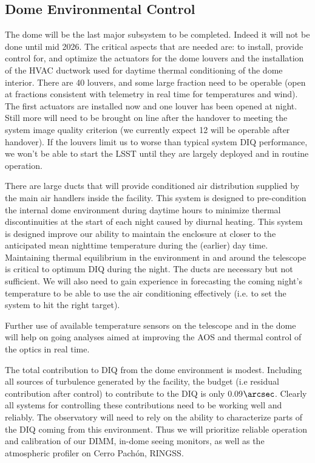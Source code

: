 \subsection{Dome Environmental Control}
The dome will be the last major subsystem to be completed. Indeed it will not be done until mid 2026. The critical aspects that are needed are: to install, provide control for, and optimize the actuators for the dome louvers and the installation of the HVAC ductwork used for daytime thermal conditioning of the dome interior. There are 40 louvers, and some large fraction need to be operable (open at fractions consistent with telemetry in real time for temperatures and wind). The first actuators are installed now and one louver has been opened at night. Still more will need to be brought on line after the handover to meeting the system image quality criterion (we currently expect 12 will be operable after handover). If the louvers limit us to worse than typical system DIQ performance, we won't be able to start the LSST until they are largely deployed and in routine operation. 

There are large ducts that will provide conditioned air distribution supplied by the main air handlers inside the facility. This system is designed to pre-condition the internal dome environment during daytime hours to minimize thermal discontinuities at the start of each night caused by diurnal heating.  This system is designed improve our ability to maintain the enclosure at closer to the anticipated mean nighttime temperature during the (earlier) day time. Maintaining thermal equilibrium in the environment in and around the telescope is critical to optimum DIQ during the night. The ducts are necessary but not sufficient. We will also need to gain experience in forecasting the coming night's temperature to be able to use the air conditioning effectively (i.e. to set the system to hit the right target). 

Further use of available temperature sensors on the telescope and in the dome will help on going analyses aimed at improving the AOS and thermal control of the optics in real time. 

The total contribution to DIQ from the dome environment is modest. Including all sources of turbulence generated by the facility, the budget (i.e residual contribution after control) to contribute to the DIQ is only 0.09$\arcsec$. Clearly all systems for controlling these contributions need to be working well and reliably. The observatory will need to rely on the ability to characterize parts of the DIQ coming from this environment. Thus we will prioritize reliable operation and calibration of our DIMM, in-dome seeing monitors, as well as the atmospheric profiler on Cerro Pach\'{o}n, RINGSS.  

